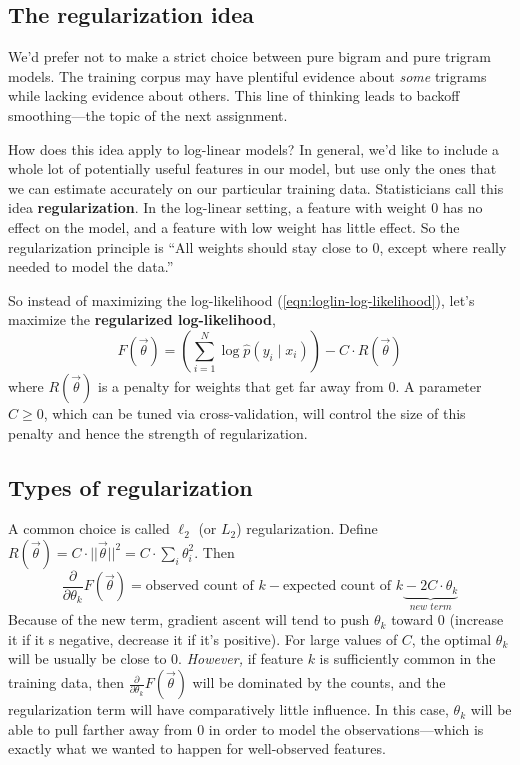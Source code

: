 \documentclass[11pt]{article}
\newcommand{\vtheta}{\vec{\theta}}
\newcommand{\ph}{\hat{p}}
\newcommand{\diffk}{\frac{\partial}{\partial \theta_k}}
\begin{document}
\subsection{The regularization idea}

We'd prefer not to make a strict choice between pure bigram and
pure trigram models.  The training corpus may have plentiful evidence
about {\em some} trigrams while lacking evidence about others.  This
line of thinking leads to backoff smoothing---the topic of the next
assignment.

How does this idea apply to log-linear models?  In general, we'd like
to include a whole lot of potentially useful features in our model,
but use only the ones that we can estimate accurately on our
particular training data.  Statisticians call this idea {\bf
  regularization}.  In the log-linear setting, a feature with weight 0
has no effect on the model, and a feature with low weight has little
effect.  So the regularization principle is ``All weights should stay
close to 0, except where really needed to model the data.''

So instead of maximizing the log-likelihood 
(\ref{eqn:loglin-log-likelihood}), let's maximize the
{\bf regularized log-likelihood}, 
\begin{equation}\label{eqn:loglin-regularized}
  F(\vtheta) = \left( \sum_{i=1}^N \log \ph(y_i \mid x_i) \right) - C\cdot R(\vtheta)
\end{equation}
where $R(\vtheta)$ is a penalty for weights that get far away from 0.
A parameter $C \geq 0$, which can be tuned via cross-validation, will control the size of this penalty and
hence the strength of regularization. 

\subsection{Types of regularization} 

A common choice is called $\ell_2$ (or $L_2$) regularization.  Define
$R(\vtheta)=C \cdot ||\vtheta||^2 = C \cdot \sum_i \theta_i^2$.  Then
\begin{equation}
  \diffk F(\vtheta) = \textrm{observed count of $k$} -
  \textrm{expected count of $k$} \underbrace{\mbox{}-2C \cdot
    \theta_k}_{\textit{new term}}
\end{equation}
Because of the new term, gradient ascent will tend to push $\theta_k$
toward 0 (increase it if it s negative, decrease it if it's positive).
For large values of $C$, the optimal $\theta_k$ will be usually be
close to 0.  {\em However,} if feature $k$ is sufficiently common in the
training data, then $\diffk F(\vtheta)$ will be dominated by the
counts, and the regularization term will have comparatively little
influence.  In this case, $\theta_k$ will be able to pull farther away
from 0 in order to model the observations---which is exactly what we
wanted to happen for well-observed features.  
\end{document}
